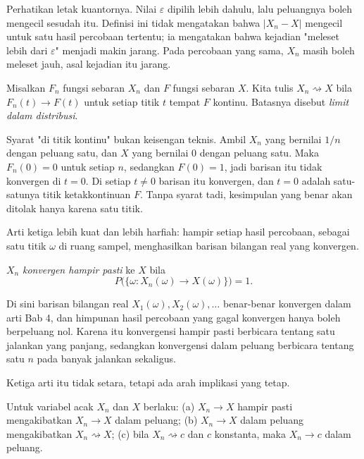 Perhatikan letak kuantornya. Nilai $\varepsilon$ dipilih lebih dahulu, lalu
peluangnya boleh mengecil sesudah itu. Definisi ini tidak mengatakan bahwa
$|X_n-X|$ mengecil untuk satu hasil percobaan tertentu; ia mengatakan bahwa
kejadian "meleset lebih dari $\varepsilon$" menjadi makin jarang. Pada percobaan
yang sama, $X_n$ masih boleh meleset jauh, asal kejadian itu jarang.


\begin{definisi}
Misalkan $F_n$ fungsi sebaran $X_n$ dan $F$ fungsi sebaran $X$. Kita tulis
$X_n\rightsquigarrow X$ bila $F_n(t)\to F(t)$ untuk setiap titik $t$ tempat $F$
kontinu. Batasnya disebut \emph{limit dalam distribusi}.
\end{definisi}

Syarat "di titik kontinu" bukan keisengan teknis. Ambil $X_n$ yang bernilai $1/n$
dengan peluang satu, dan $X$ yang bernilai $0$ dengan peluang satu. Maka $F_n(0)=0$
untuk setiap $n$, sedangkan $F(0)=1$, jadi barisan itu tidak konvergen di $t=0$.
Di setiap $t\neq0$ barisan itu konvergen, dan $t=0$ adalah satu-satunya titik
ketakkontinuan $F$. Tanpa syarat tadi, kesimpulan yang benar akan ditolak hanya
karena satu titik.

Arti ketiga lebih kuat dan lebih harfiah: hampir setiap hasil percobaan, sebagai
satu titik $\omega$ di ruang sampel, menghasilkan barisan bilangan real yang
konvergen.

\begin{definisi}
$X_n$ \emph{konvergen hampir pasti} ke $X$ bila
\[
P\bigl(\{\omega : X_n(\omega)\to X(\omega)\}\bigr)=1 .
\]
\end{definisi}

Di sini barisan bilangan real $X_1(\omega),X_2(\omega),\dots$ benar-benar
konvergen dalam arti Bab 4, dan himpunan hasil percobaan yang gagal konvergen
hanya boleh berpeluang nol. Karena itu konvergensi hampir pasti berbicara tentang
satu jalankan yang panjang, sedangkan konvergensi dalam peluang berbicara tentang
satu $n$ pada banyak jalankan sekaligus.

Ketiga arti itu tidak setara, tetapi ada arah implikasi yang tetap.

\begin{teorema}
Untuk variabel acak $X_n$ dan $X$ berlaku:
(a) $X_n\to X$ hampir pasti mengakibatkan $X_n\to X$ dalam peluang;
(b) $X_n\to X$ dalam peluang mengakibatkan $X_n\rightsquigarrow X$;
(c) bila $X_n\rightsquigarrow c$ dan $c$ konstanta, maka $X_n\to c$ dalam peluang.
\end{teorema}


